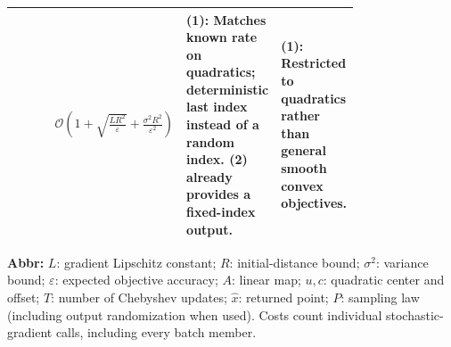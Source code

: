 \begin{table}[tp]
\begin{threeparttable}
\begin{tabularx}{\linewidth}{@{}>{\raggedright\arraybackslash}p{0.20\linewidth}>{\raggedright\arraybackslash}p{0.32\linewidth}>{\raggedright\arraybackslash}p{0.25\linewidth}>{\raggedright\arraybackslash}X@{}}
& $\mathcal{O}\!\left(1+\sqrt{\frac{LR^2}{\varepsilon}}+\frac{\sigma^2R^2}{\varepsilon^2}\right)$
& \textbf{(1)}: Matches known rate on quadratics; deterministic last index instead of a random index. \textbf{(2)} already provides a fixed-index output.
& \textbf{(1)}: Restricted to quadratics rather than general smooth convex objectives. \\
\bottomrule
\end{tabularx}
\begin{tablenotes}[flushleft]\footnotesize
\item[] \textbf{Abbr:} $L$: gradient Lipschitz constant; $R$: initial-distance bound; $\sigma^2$: variance bound; $\varepsilon$: expected objective accuracy; $A$: linear map; $u,c$: quadratic center and offset; $T$: number of Chebyshev updates; $\widehat x$: returned point; $P$: sampling law (including output randomization when used). Costs count individual stochastic-gradient calls, including every batch member.
\end{tablenotes}
\end{threeparttable}
\end{table}
\clearpage
